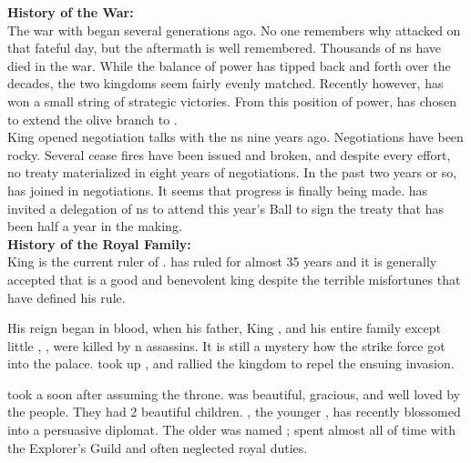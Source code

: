 \documentclass[blue]{NeptuneBall}
\begin{document}
\name{\bAtlantian{}}


{\bf History of the War:}\\
The war with \pPacifica{} began several generations ago. No one remembers why \pPacifica{} attacked on that fateful day, but the aftermath is well remembered. Thousands of \pAtlantis{}ns have died in the war. While the balance of power has tipped back and forth over the decades, the two kingdoms seem fairly evenly matched. Recently however, \pAtlantis{} has won a small string of strategic victories. From this position of power, \cKing{\King} \cKing{} has chosen to extend the olive branch to \pPacifica{}.\\

King \cKing{\MYname{}} opened negotiation talks with the \pPacifica{}ns nine years ago. Negotiations have been rocky. Several cease fires have been issued and broken, and despite every effort, no treaty materialized in eight years of negotiations. In the past two years or so, \cPrincess{\Prince} \cPrincess{} has joined \cPrincess{\their} \cKing{\parent} in negotiations. It seems that progress is finally being made. \cKing{\King} \cKing{} has  invited a delegation of \pPacifica{}ns to attend this year's \cExExKing{} Ball to sign the treaty that has been half a year in the making.\\

{\bf History of the Royal Family:}\\
King \cKing{\MYname{}} is the current ruler of \pAtlantis{}. \cKing{\They} has ruled for almost 35 years and it is generally accepted that \cKing{\they} is a good and benevolent king despite the terrible misfortunes that have defined his rule.

His reign began in blood, when his father, King \cExKing{}, and his entire family except \cKing{\their} little \cPlant{\sibling}, \cPlant{}, were killed by \pPacifica{}n assassins. It is still a mystery how the strike force got into the palace. \cKing{} took up \iTrident{\MYname{}}, and rallied the kingdom to repel the ensuing invasion.

\cKing{\King} \cKing{} took a \cQueen{\spouse} soon after assuming the throne. \cQueen{\King} \cQueen{} was beautiful, gracious, and well loved by the people. They had 2 beautiful children. \cPrincess{\Prince} \cPrincess{}, the younger \cPrincess{\offspring}, has recently blossomed into a persuasive diplomat. The older \cAriel{\Prince} was named \cAriel{}; \cAriel{} spent almost all of \cAriel{\their} time with the Explorer's Guild and often neglected \cAriel{\their} royal duties. 
\end{document}
